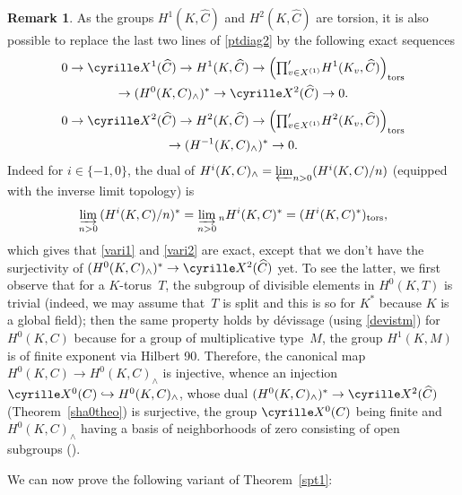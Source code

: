 \documentclass[JEP,XML,SOM,Unicode, NoEqCountersInSection]{cedram}
\newcommand\hto{\mathrel{\lhook\joinrel\to}}
\newcommand{\tprod}{{\textstyle\prod}}
\theoremstyle{plain}
\theoremstyle{definition}
\newtheorem{rema}[theo]{Remark}
\newcommand\Sha{\cyrille X}
\newcommand \tors {\mathrm{tors}}
\begin{document}
\begin{rema} \label{variantors}
As the groups $H^1(K,\widehat C)$ and $H^2(K,\widehat C)$ are torsion,
it is also possible to replace the last two lines of \eqref{ptdiag2} by
the following exact sequences\vspace*{-3pt}
\begin{multline} \label{vari1}
0 \to \Sha^1(\widehat C) \to H^1(K,\widehat C) \to \Bigl(\tprod^{\prime}_{v \in X^{(1)}}H^1(K_v,\widehat C)\Bigr)_\tors\\
\to (H^0(K,C)_{\wedge}) ^* \to\Sha^2(\widehat C) \to 0.
\end{multline}
\vspace*{-20pt}
\begin{multline} \label{vari2}
0 \to \Sha^2(\widehat C) \to H^2(K,\widehat C) \to \Bigl(\tprod^{\prime}_{v \in X^{(1)}}H^2(K_v,\widehat C) \Bigl)_\tors\\
\to (H^{-1}(K,C)_{\wedge}) ^* \to 0.
\end{multline}
Indeed for $i \in \{-1,0\}$, the dual of $H^i(K,C)_{\wedge}=
\varprojlim_{n >0} (H^i(K,C)/n)$ (equipped with the inverse limit topology) is
\[
\varinjlim_{n >0} \, (H^i(K,C)/n)^*=\varinjlim_{n >0} {}_n H^i(K,C)^*=
(H^i(K,C)^*)_\tors,
\]
which gives that \eqref{vari1} and \eqref{vari2} are exact,
except that we don't have the surjectivity of
$(H^0(K,C)_{\wedge}) ^* \to \Sha^2(\widehat C)$ yet. To see the latter,
we first observe that for a $K$-torus~$T$, the subgroup of divisible
elements in $H^0(K,T)$ is trivial (indeed, we may assume that~$T$ is split
and this is so for $K^*$ because $K$ is a global field); then the same
property holds by dévissage (using \eqref{devistm}) for $H^0(K,C)$ because
for a group of multiplicative type~$M$, the group $H^1(K,M)$ is of finite
exponent via Hilbert 90. Therefore, the canonical map $H^0(K,C) \to
H^0(K,C)_{\wedge}$ is injective, whence
an injection $\Sha^0(C) \hto\nobreak H^0(K,C)_{\wedge}$, whose dual
$(H^0(K,C)_{\wedge})^* \to \Sha^2(\widehat C)$ (\cf Theorem~\ref{sha0theo})
is surjective, the group $\Sha^0(C)$ being finite and $H^0(K,C)_{\wedge}$
having a basis of neighborhoods of zero
consisting of open subgroups (\cf \cite[Lem.\,2.4]{hss}).
\end{rema}

We can now prove the following variant of Theorem~\ref{spt1}:
\end{document}
